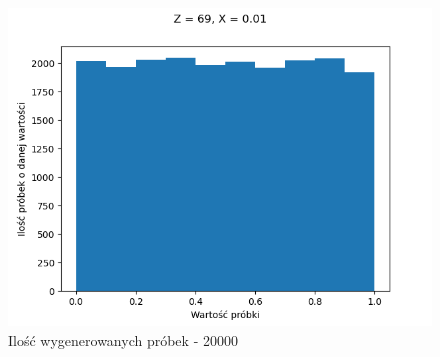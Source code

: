 \documentclass[12pt,a4paper]{article}
\begin{document}
  \begin{figure}[H]
    \centering
    \includegraphics[height=0.25\textheight]{figures/Figure_13.png}
    \caption{Ilość wygenerowanych próbek - 20000}
    \label{fig:13}
  \end{figure}








\end{document}
